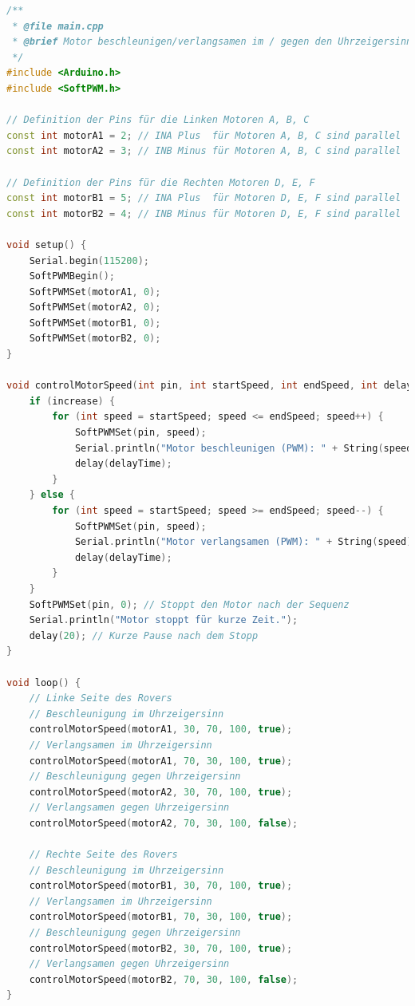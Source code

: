 \documentclass{vorlage-design-main}
\begin{document}
\begin{lstlisting}[language={C++}]
/**
 * @file main.cpp
 * @brief Motor beschleunigen/verlangsamen im / gegen den Uhrzeigersinn
 */
#include <Arduino.h>
#include <SoftPWM.h>

// Definition der Pins für die Linken Motoren A, B, C
const int motorA1 = 2; // INA Plus  für Motoren A, B, C sind parallel
const int motorA2 = 3; // INB Minus für Motoren A, B, C sind parallel

// Definition der Pins für die Rechten Motoren D, E, F
const int motorB1 = 5; // INA Plus  für Motoren D, E, F sind parallel
const int motorB2 = 4; // INB Minus für Motoren D, E, F sind parallel

void setup() {
    Serial.begin(115200);
    SoftPWMBegin();
    SoftPWMSet(motorA1, 0);
    SoftPWMSet(motorA2, 0);
    SoftPWMSet(motorB1, 0);
    SoftPWMSet(motorB2, 0);
}

void controlMotorSpeed(int pin, int startSpeed, int endSpeed, int delayTime, bool increase) {
    if (increase) {
        for (int speed = startSpeed; speed <= endSpeed; speed++) {
            SoftPWMSet(pin, speed);
            Serial.println("Motor beschleunigen (PWM): " + String(speed));
            delay(delayTime);
        }
    } else {
        for (int speed = startSpeed; speed >= endSpeed; speed--) {
            SoftPWMSet(pin, speed);
            Serial.println("Motor verlangsamen (PWM): " + String(speed));
            delay(delayTime);
        }
    }
    SoftPWMSet(pin, 0); // Stoppt den Motor nach der Sequenz
    Serial.println("Motor stoppt für kurze Zeit.");
    delay(20); // Kurze Pause nach dem Stopp
}

void loop() {
    // Linke Seite des Rovers
    // Beschleunigung im Uhrzeigersinn
    controlMotorSpeed(motorA1, 30, 70, 100, true);
    // Verlangsamen im Uhrzeigersinn
    controlMotorSpeed(motorA1, 70, 30, 100, true);
    // Beschleunigung gegen Uhrzeigersinn
    controlMotorSpeed(motorA2, 30, 70, 100, true);
    // Verlangsamen gegen Uhrzeigersinn
    controlMotorSpeed(motorA2, 70, 30, 100, false);

    // Rechte Seite des Rovers
    // Beschleunigung im Uhrzeigersinn
    controlMotorSpeed(motorB1, 30, 70, 100, true);
    // Verlangsamen im Uhrzeigersinn
    controlMotorSpeed(motorB1, 70, 30, 100, true);
    // Beschleunigung gegen Uhrzeigersinn
    controlMotorSpeed(motorB2, 30, 70, 100, true);
    // Verlangsamen gegen Uhrzeigersinn
    controlMotorSpeed(motorB2, 70, 30, 100, false);
}
\end{lstlisting}
\end{document}
